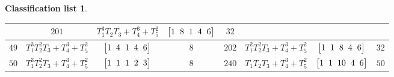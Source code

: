 \documentclass[10pt,a4paper]{amsart}
\theoremstyle{definition}
\newtheorem{class-list}[thm]{Classification list}
\numberwithin{equation}{section}
\begin{document}
\begin{class-list}
\begin{table}[h!]
\begin{tabu}{c|c|c|c||c|c|c|c}
&${201}$&${T_{1}^{3}T_{2}T_{3}+T_{4}^{3}+T_{5}^{2}}$
&$\arraycolsep=1mm\begin{bmatrix}{1} & {8} & {1} & {4} & {6}\end{bmatrix}$&${32}$
\\
\hline
${49}$&${T_{1}^{3}T_{2}^{2}T_{3}+T_{4}^{3}+T_{5}^{2}}$
&$\arraycolsep=1mm\begin{bmatrix}{1} & {4} & {1} & {4} & {6}\end{bmatrix}$&${8}$
&${202}$&${T_{1}^{2}T_{2}^{2}T_{3}+T_{4}^{3}+T_{5}^{2}}$
&$\arraycolsep=1mm\begin{bmatrix}{1} & {1} & {8} & {4} & {6}\end{bmatrix}$&${32}$
\\
\hline
${50}$&${T_{1}^{3}T_{2}^{2}T_{3}+T_{4}^{3}+T_{5}^{2}}$
&$\arraycolsep=1mm\begin{bmatrix}{1} & {1} & {1} & {2} & {3}\end{bmatrix}$&${8}$
&${240}$&${T_{1}T_{2}T_{3}+T_{4}^{3}+T_{5}^{2}}$
&$\arraycolsep=1mm\begin{bmatrix}{1} & {1} & {10} & {4} & {6}\end{bmatrix}$&${50}$
\\
\hline
\end{tabu}\vspace{-4mm}
\end{table}
\end{class-list}
\end{document}
